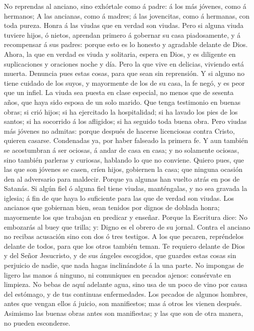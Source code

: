  No reprendas al anciano, sino exhórtale como á padre: á los
más jóvenes, como á hermanos;  A las ancianas, como á
madres; á las jovencitas, como á hermanas, con toda pureza. 
Honra á las viudas que en verdad son viudas.  Pero si alguna
viuda tuviere hijos, ó nietos, aprendan primero á gobernar su casa
piadosamente, y á recompensar á sus padres: porque esto es lo honesto y
agradable delante de Dios.  Ahora, la que en verdad es viuda
y solitaria, espera en Dios, y es diligente en suplicaciones y oraciones
noche y día.  Pero la que vive en delicias, viviendo está
muerta.  Denuncia pues estas cosas, para que sean sin
reprensión.  Y si alguno no tiene cuidado de los suyos, y
mayormente de los de su casa, la fe negó, y es peor que un infiel.
 La viuda sea puesta en clase especial, no menos que de
sesenta años, que haya sido esposa de un solo marido.  Que
tenga testimonio en buenas obras; si crió hijos; si ha ejercitado la
hospitalidad; si ha lavado los pies de los santos; si ha socorrido á los
afligidos; si ha seguido toda buena obra.  Pero viudas más
jóvenes no admitas: porque después de hacerse licenciosas contra Cristo,
quieren casarse.  Condenadas ya, por haber falseado la
primera fe.  Y aun también se acostumbran á ser ociosas, á
andar de casa en casa; y no solamente ociosas, sino también parleras y
curiosas, hablando lo que no conviene.  Quiero pues, que
las que son jóvenes se casen, críen hijos, gobiernen la casa; que
ninguna ocasión den al adversario para maldecir.  Porque ya
algunas han vuelto atrás en pos de Satanás.  Si algún fiel
ó alguna fiel tiene viudas, manténgalas, y no sea gravada la iglesia; á
fin de que haya lo suficiente para las que de verdad son viudas.
 Los ancianos que gobiernan bien, sean tenidos por dignos
de doblada honra; mayormente los que trabajan en predicar y enseñar.
 Porque la Escritura dice: No embozarás al buey que trilla;
y: Digno es el obrero de su jornal.  Contra el anciano no
recibas acusación sino con dos ó tres testigos.  A los que
pecaren, repréndelos delante de todos, para que los otros también teman.
 Te requiero delante de Dios y del Señor Jesucristo, y de
sus ángeles escogidos, que guardes estas cosas sin perjuicio de nadie,
que nada hagas inclinándote á la una parte.  No impongas de
ligero las manos á ninguno, ni comuniques en pecados ajenos: consérvate
en limpieza.  No bebas de aquí adelante agua, sino usa de
un poco de vino por causa del estómago, y de tus continuas enfermedades.
 Los pecados de algunos hombres, antes que vengan ellos á
juicio, son manifiestos; mas á otros les vienen después. 
Asimismo las buenas obras antes son manifiestas; y las que son de otra
manera, no pueden esconderse.

